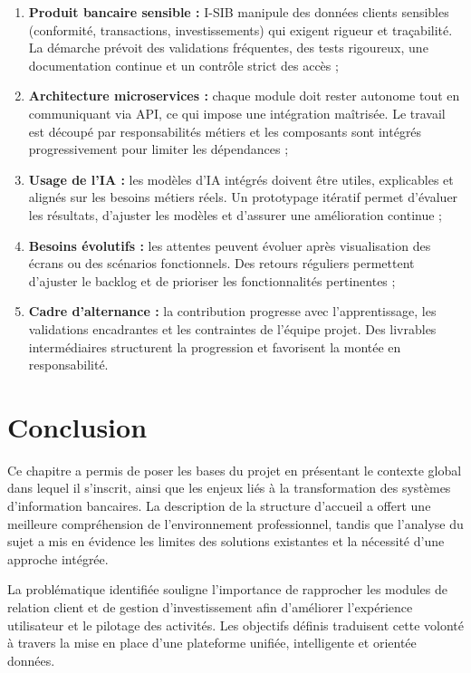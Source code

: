 \documentclass[a4paper,12pt]{report}
\begin{document}
\begin{enumerate}
  \item \textbf{Produit bancaire sensible :} I-SIB manipule des données clients sensibles (conformité, transactions, investissements) qui exigent rigueur et traçabilité. La démarche prévoit des validations fréquentes, des tests rigoureux, une documentation continue et un contrôle strict des accès ;
  \item \textbf{Architecture microservices :} chaque module doit rester autonome tout en communiquant via API, ce qui impose une intégration maîtrisée. Le travail est découpé par responsabilités métiers et les composants sont intégrés progressivement pour limiter les dépendances ;
  \item \textbf{Usage de l'IA :} les modèles d'IA intégrés doivent être utiles, explicables et alignés sur les besoins métiers réels. Un prototypage itératif permet d'évaluer les résultats, d'ajuster les modèles et d'assurer une amélioration continue ;
  \item \textbf{Besoins évolutifs :} les attentes peuvent évoluer après visualisation des écrans ou des scénarios fonctionnels. Des retours réguliers permettent d'ajuster le backlog et de prioriser les fonctionnalités pertinentes ;
  \item \textbf{Cadre d'alternance :} la contribution progresse avec l'apprentissage, les validations encadrantes et les contraintes de l'équipe projet. Des livrables intermédiaires structurent la progression et favorisent la montée en responsabilité.
\end{enumerate}
\section*{Conclusion}
{}

Ce chapitre a permis de poser les bases du projet en présentant le contexte global dans lequel il s'inscrit, ainsi que les enjeux liés à la transformation des systèmes d'information bancaires. La description de la structure d'accueil a offert une meilleure compréhension de l'environnement professionnel, tandis que l'analyse du sujet a mis en évidence les limites des solutions existantes et la nécessité d'une approche intégrée.

La problématique identifiée souligne l'importance de rapprocher les modules de relation client et de gestion d'investissement afin d'améliorer l'expérience utilisateur et le pilotage des activités. Les objectifs définis traduisent cette volonté à travers la mise en place d'une plateforme unifiée, intelligente et orientée données.
\end{document}
